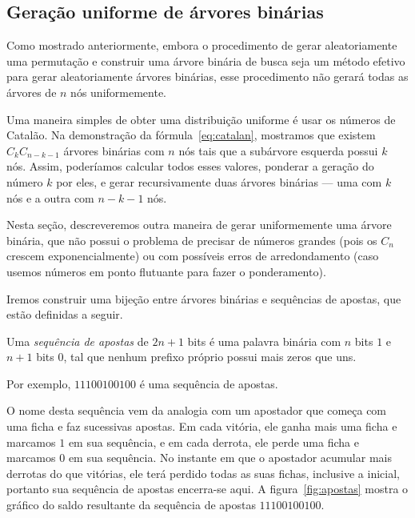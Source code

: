 \subsection{Geração uniforme de árvores binárias}

Como mostrado anteriormente,
embora o procedimento de gerar aleatoriamente uma permutação
e construir uma árvore binária de busca
seja um método efetivo para gerar aleatoriamente árvores binárias,
esse procedimento não gerará todas as árvores de $n$ nós uniformemente.

Uma maneira simples de obter uma distribuição uniforme
é usar os números de Catalão.
Na demonstração da fórmula~\ref{eq:catalan},
mostramos que existem $C_k C_{n-k-1}$ árvores binárias com $n$ nós
tais que a subárvore esquerda possui $k$ nós.
Assim,
poderíamos calcular todos esses valores,
ponderar a geração do número $k$ por eles,
e gerar recursivamente duas árvores binárias
--- uma com $k$ nós e a outra com $n - k - 1$ nós.

Nesta seção,
descreveremos outra maneira de gerar uniformemente uma árvore binária,
que não possui o problema de precisar de números grandes
(pois os $C_n$ crescem exponencialmente)
ou com possíveis erros de arredondamento
(caso usemos números em ponto flutuante para fazer o ponderamento).

Iremos construir uma bijeção entre árvores binárias e sequências de apostas,
que estão definidas a seguir.

\begin{definition}
    Uma \emph{sequência de apostas} de $2n+1$ bits
    é uma palavra binária com $n$ bits $1$ e $n+1$ bits $0$,
    tal que
    nenhum prefixo próprio possui mais zeros que uns.
\end{definition}

Por exemplo, $11100100100$ é uma sequência de apostas.

O nome desta sequência vem da analogia com um apostador
que começa com uma ficha e faz sucessivas apostas.
Em cada vitória, ele ganha mais uma ficha e marcamos $1$ em sua sequência,
e em cada derrota, ele perde uma ficha e marcamos $0$ em sua sequência.
No instante em que o apostador acumular mais derrotas do que vitórias,
ele terá perdido todas as suas fichas, inclusive a inicial,
portanto sua sequência de apostas encerra-se aqui.
A figura~\ref{fig:apostas}
mostra o gráfico do saldo resultante da sequência de apostas $11100100100$.

